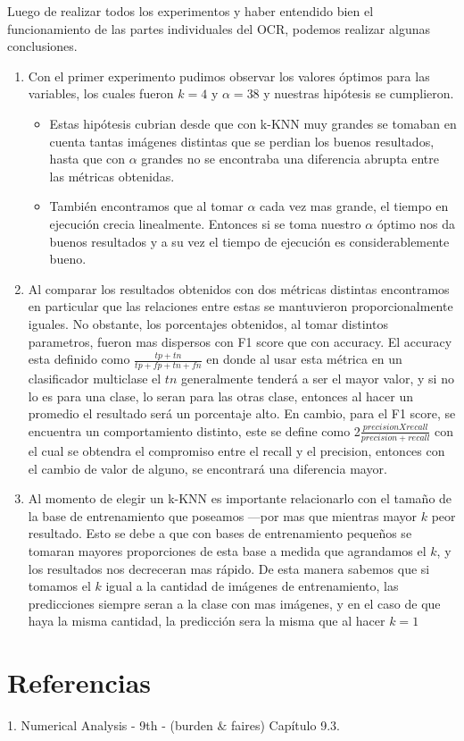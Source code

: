 Luego de realizar todos los experimentos y haber entendido bien el funcionamiento de las partes individuales del OCR, podemos realizar algunas conclusiones.

\begin{enumerate}
	\item Con el primer experimento pudimos observar los valores óptimos para las variables, los cuales fueron $k = 4$ y $\alpha = 38$ y nuestras hipótesis se cumplieron. 
	\begin{itemize}
		\item Estas hipótesis cubrian desde que con k-KNN muy grandes se tomaban en cuenta tantas imágenes distintas que se perdian los buenos resultados, hasta que con $\alpha$ grandes no se encontraba una diferencia abrupta entre las métricas obtenidas.
		\item También encontramos que al tomar $\alpha$ cada vez mas grande, el tiempo en ejecución crecia linealmente. Entonces si se toma nuestro $\alpha$ óptimo nos da buenos resultados y a su vez el tiempo de ejecución es considerablemente bueno.
	\end{itemize}
	\item Al comparar los resultados obtenidos con dos métricas distintas encontramos en particular que las relaciones entre estas se mantuvieron proporcionalmente iguales. No obstante, los porcentajes obtenidos, al tomar distintos parametros, fueron mas dispersos con F1 score que con accuracy. El accuracy esta definido como $\frac{tp + tn}{tp + fp + tn + fn}$ en donde al usar esta métrica en un clasificador multiclase el $tn$ generalmente tenderá a ser el mayor valor, y si no lo es para una clase, lo seran para las otras clase, entonces al hacer un promedio el resultado será un porcentaje alto. En cambio, para el F1 score, se encuentra un comportamiento distinto, este se define como 2$\frac{precisionXrecall}{precision + recall}$ con el cual se obtendra el compromiso entre el recall y el precision, entonces con el cambio de valor de alguno, se encontrará una diferencia mayor.
	\item Al momento de elegir un k-KNN es importante relacionarlo con el tamaño de la base de entrenamiento que poseamos ---por mas que mientras mayor $k$ peor resultado. Esto se debe a que con bases de entrenamiento pequeños se tomaran mayores proporciones de esta base a medida que agrandamos el $k$, y los resultados nos decreceran mas rápido. De esta manera sabemos que si tomamos el $k$ igual a la cantidad de imágenes de entrenamiento, las predicciones siempre seran a la clase con mas imágenes, y en el caso de que haya la misma cantidad, la predicción sera la misma que al hacer $k = 1$


\end{enumerate}


\section{Referencias}
1. Numerical Analysis - 9th - (burden $\&$ faires) Capítulo 9.3.